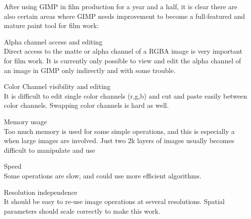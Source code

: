After using GIMP in film production for a year and a half, it is clear there
are also certain areas where GIMP needs improvement to become a full-featured
and mature paint tool for film work:

Alpha channel access and editing\\
Direct access to the matte or alpha channel of a RGBA image is very important
for film work. It is currently only possible to view and edit the alpha channel
of an image in GIMP only indirectly and with some trouble.  

Color Channel visibility and editing\\
It is difficult to edit single color channels (r,g,b) and cut and paste easily
between color channels. Swapping color channels is hard as well.

Memory usage\\
Too much memory is used for some simple operations, and this is especially 
a when large images are involved. Just two 2k layers of images usually becomes
difficult to manipulate and use

Speed\\
Some operations are slow, and could use more efficient algorithms.

Resolution independence\\
It should be easy to re-use image operations at several resolutions. Spatial
parameters should scale correctly to make this work.

